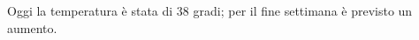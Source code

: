 \documentclass[12pt]{article}
\begin{document}
Oggi la temperatura \`e stata di 38 gradi; 
per il fine settimana \`e previsto un aumento.
\end{document}
